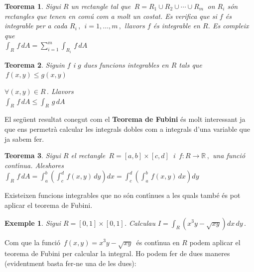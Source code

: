 \documentclass[12pt]{article}
\newtheorem{teorema}{Teorema}[subsection]
\newtheorem{exemple}{Exemple}[subsection]
\newcommand{\R}{\mathbb{R}}
\begin{document}
\begin{teorema}
Sigui $R$ un rectangle tal que $\,R=R_1\cup R_2\cup\cdots\cup R_m\,$
on $R_i$ s{\'o}n rectangles que  tenen en com{\'u} com a molt un costat. Es
verifica que si $f$ {\'e}s integrable per a cada $R_i\,,\ \
i=1,\ldots,m\,,$ llavors $f$ {\'e}s integrable en $R$. Es compleix que\\

\hspace{3cm}$\displaystyle
\int_R\,f\,dA=\sum\limits_{i=1}^m\int_{R_i}\,f\,dA$
\end{teorema}

\begin{teorema}
Siguin $f$ i $g$ dues funcions integrables en $R$ tals que
$\,f(x,y)\leq g(x,y)$

$\forall (x,y)\in R\,.$ Llavors\\

\hspace{3cm}$\displaystyle \int_R\,f\,dA\leq\int_R\,g\,dA$
\end{teorema}

El seg{\"u}ent resultat conegut com el \textbf{Teorema de Fubini} {\'e}s
molt interessant ja que ens permetr{\`a} calcular les integrals dobles
com a integrals d'una variable que ja sabem fer.

\begin{teorema}
Sigui $R$ el rectangle $\, R=[a,b]\times[c,d]\,$ i $\, f:R\to \R\,,$
una funci{\'o} cont{\'\i}nua. Aleshores\\

\hspace{3cm}$\displaystyle
\int_R\,f\,dA=\int_a^b\left(\int_c^d\,f(x,y)\,dy\right)dx=
\int_c^d\left(\int_a^b\,f(x,y)\,dx\right)dy$
\end{teorema}

\begin{observacio}
Existeixen funcions integrables que no s{\'o}n cont{\'\i}nues a les quals
tamb{\'e} {\'e}s pot aplicar el teorema de Fubini.
\end{observacio}

\begin{exemple}
Sigui $R=[0,1]\times[0,1]$. Calculau $I=\displaystyle\int_R(x^3 y
-\sqrt{x y})dx\, dy\,.$
\end{exemple}

Com que la funci{\'o} $\,f(x,y)=x^3 y -\sqrt{x y}\,$ {\'e}s cont{\'\i}nua en $R$
podem aplicar el teorema de Fubini per calcular la integral. Ho
podem fer de dues maneres (evidentment basta fer-ne una de les
dues):\\
\end{document}
